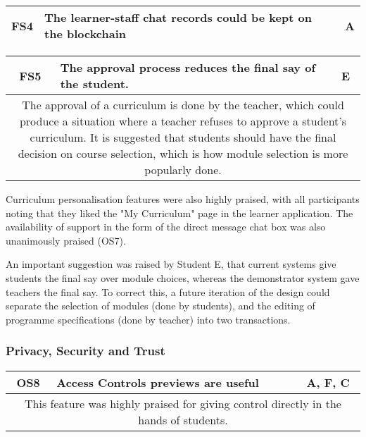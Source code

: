 \begin{table}[!ht]
	\begin{tabularx}{\textwidth}{|c|X|c|}
		\hline
		FS4 & \textbf{The learner-staff chat records could be kept on the blockchain} & A \\
		\hline
	\end{tabularx}
\end{table}

\begin{table}[!ht]
	\begin{tabularx}{\textwidth}{|c|X|c|}
		\hline
		FS5 & \textbf{The approval process reduces the final say of the student.} & E \\
		\hline
		\multicolumn{3}{|X|}{
			The approval of a curriculum is done by the teacher, which could produce a 
			situation where a teacher refuses to approve a student's curriculum. 
			It is suggested that students should have the final decision on course 
			selection, which is how module selection is more popularly done.
		} \\
		\hline
	\end{tabularx}
\end{table}

Curriculum personalisation features were also highly praised,
with all participants noting that they liked the "My Curriculum" page in the 
learner application. The availability of support in the form of the direct message 
chat box was also unanimously praised (OS7).

An important suggestion was raised by Student E, that current systems give 
students the final say over module choices, whereas the demonstrator system 
gave teachers the final say. To correct this, a future iteration of 
the design could separate the selection of modules (done by students), 
and the editing of programme specifications (done by teacher) into two transactions.


\subsubsection{Privacy, Security and Trust}

\begin{table}[!ht]
	\begin{tabularx}{\textwidth}{|c|X|c|}
		\hline
		OS8 & \textbf{Access Controls previews are useful} & A, F, C \\
		\hline
		\multicolumn{3}{|X|}{
			This feature was highly praised for giving control directly in the hands of students.
		}                                                            \\
		\hline
	\end{tabularx}
\end{table}


